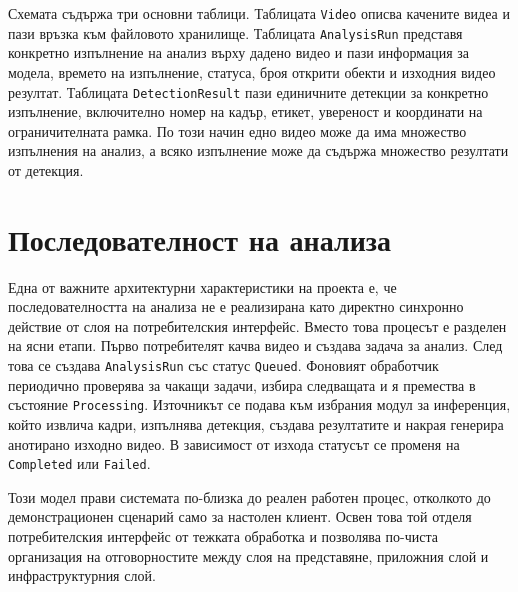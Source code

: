 Схемата съдържа три основни таблици. Таблицата \texttt{Video} описва качените видеа и пази връзка към файловото хранилище. Таблицата \texttt{AnalysisRun} представя конкретно изпълнение на анализ върху дадено видео и пази информация за модела, времето на изпълнение, статуса, броя открити обекти и изходния видео резултат. Таблицата \texttt{DetectionResult} пази единичните детекции за конкретно изпълнение, включително номер на кадър, етикет, увереност и координати на ограничителната рамка. По този начин едно видео може да има множество изпълнения на анализ, а всяко изпълнение може да съдържа множество резултати от детекция.


\section{Последователност на анализа}

Една от важните архитектурни характеристики на проекта е, че последователността на анализа не е реализирана като директно синхронно действие от слоя на потребителския интерфейс. Вместо това процесът е разделен на ясни етапи. Първо потребителят качва видео и създава задача за анализ. След това се създава \texttt{AnalysisRun} със статус \texttt{Queued}. Фоновият обработчик периодично проверява за чакащи задачи, избира следващата и я премества в състояние \texttt{Processing}. Източникът се подава към избрания модул за инференция, който извлича кадри, изпълнява детекция, създава резултатите и накрая генерира анотирано изходно видео. В зависимост от изхода статусът се променя на \texttt{Completed} или \texttt{Failed}.

Този модел прави системата по-близка до реален работен процес, отколкото до демонстрационен сценарий само за настолен клиент. Освен това той отделя потребителския интерфейс от тежката обработка и позволява по-чиста организация на отговорностите между слоя на представяне, приложния слой и инфраструктурния слой.

